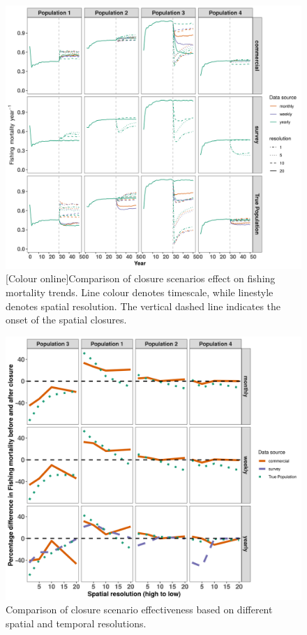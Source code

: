 \documentclass[preprint]{elsarticle}
\begin{document}
\begin{figure}[!ht]
	\includegraphics[width = \linewidth]{../analysis/F_trendsREV}
	\caption{[Colour online]Comparison of closure scenarios effect on
		fishing mortality trends. Line colour denotes timescale, while
		linestyle denotes spatial resolution. The vertical dashed line
		indicates the onset of the spatial closures.}
	\label{fig:3}
\end{figure}

\begin{figure}[!ht]
	\includegraphics[width =\linewidth]{./Plots/f_diff_effectiveness}
	\caption{Comparison of closure scenario effectiveness based on
		different spatial and temporal resolutions.}
	\label{fig:4}
\end{figure}	
\end{document}
